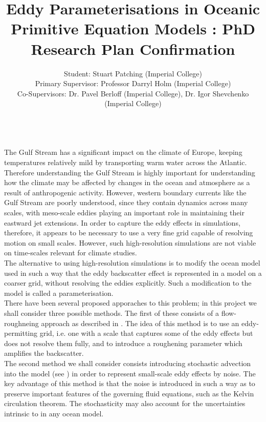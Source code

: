 \documentclass[11pt]{article}
\begin{document}
\title{\vspace{-4.0em}Eddy Parameterisations in Oceanic Primitive Equation Models : PhD Research Plan Confirmation}
\date{\vspace{-0.5em}}
\author{Student: Stuart Patching (Imperial College)\\
\small{Primary Supervisor: Professor Darryl Holm (Imperial College)}\\
\small{Co-Supervisors: Dr. Pavel Berloff (Imperial College), Dr. Igor Shevchenko (Imperial College)} \vspace{-2em}}
\maketitle
\textbf{ }\\
		The Gulf Stream has a significant impact on the climate of Europe, keeping temperatures relatively mild by transporting warm water across the Atlantic. Therefore understanding the Gulf Stream is highly important for understanding how the climate may be affected by changes in the ocean and atmosphere as a result of anthropogenic activity. However, western boundary currents like the Gulf Stream are poorly understood, since they contain dynamics across many scales, with meso-scale eddies playing an important role in maintaining their eastward jet extensions. In order to capture the eddy effects in simulations, therefore, it appears to be necessary to use a very fine grid capable of resolving motion on small scales. However, such high-resolution simulations are not viable on time-scales relevant for climate studies. \\
		\indnt The alternative to using high-resolution simulations is to modify the ocean model used in such a way that the eddy backscatter effect is represented in a model on a coarser grid, without resolving the eddies explicitly. Such a modification to the model is called a parameterisation. \\
		\linebreak
		There have been several proposed apporaches to this problem; in this project we shall consider three possible methods. The first of these consists of a flow-roughneing approach as described in \cite{i}. The idea of this method is to use an eddy-permitting grid, i.e. one with a scale that captures some of the eddy effects but does not resolve them fully, and to introduce a roughening parameter which amplifies the backscatter. \\
		\indnt The second method we shall consider consists introducing stochastic advection into the model (see \cite{ii}) in order to represent small-scale eddy effects by noise. The key advantage of this method is that the noise is introduced in such a way as to preserve important features of the governing fluid equations, such as the Kelvin circulation theorem. The stochasticity may also account for the uncertainties intrinsic to in any ocean model. \\
\end{document}
